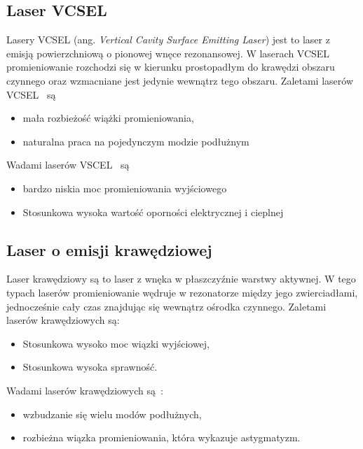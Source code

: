\subsection{Laser VCSEL}
Lasery VCSEL (ang. \textit{Vertical Cavity Surface Emitting Laser}) jest to laser z emisją powierzchniową o pionowej wnęce rezonansowej.
W laserach VCSEL promieniowanie rozchodzi się w kierunku prostopadłym do krawędzi obszaru czynnego oraz wzmacniane jest jedynie
wewnątrz tego obszaru\cite{publikcja_nakwaski}. Zaletami laserów VCSEL~\cite{publikcja_nakwaski} są
\begin{itemize}
\item mała rozbieżość wiążki promieniowania,
\item naturalna praca na pojedynczym modzie podłużnym
\end{itemize}
Wadami laserów VSCEL~\cite{publikcja_nakwaski} są
\begin{itemize}
\item bardzo niskia moc promieniowania wyjściowego
\item Stosunkowa wysoka wartość oporności elektrycznej i cieplnej
\end{itemize}
\subsection{Laser o emisji krawędziowej}
Laser krawędziowy są to laser z wnęka w płaszczyźnie warstwy aktywnej. W tego typach laserów promieniowanie wędruje w rezonatorze między
jego zwierciadłami, jednocześnie cały czas znajdując się wewnątrz ośrodka czynnego. Zaletami laserów krawędziowych są:
\begin{itemize}
\item Stosunkowa wysoko moc wiązki wyjściowej\cite{publikcja_nakwaski},
\item Stosunkowa wysoka sprawność.
\end{itemize}
Wadami laserów krawędziowych są~\cite{publikcja_nakwaski}:
\begin{itemize}
\item wzbudzanie się wielu modów podłużnych,
\item rozbieżna wiązka promieniowania, która wykazuje astygmatyzm.
\end{itemize}
